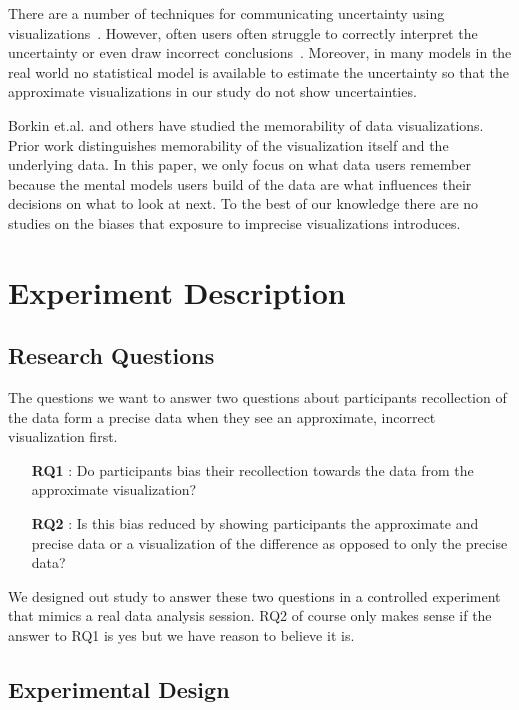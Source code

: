 \documentclass[10pt,journal,compsoc]{IEEEtran}
\begin{document}
There are a number of techniques for communicating uncertainty using visualizations~\cite{kay2016ish, olston2002visualizing}.
However, often users often struggle to correctly interpret the uncertainty or even draw incorrect conclusions~\cite{joslyn2013decisions}.
Moreover, in many models in the real world no statistical model is available to estimate the uncertainty so that the approximate visualizations in our study do not show uncertainties.

Borkin et.al. \cite{borkin2013makes} and others have studied the memorability of data visualizations.
Prior work distinguishes memorability of the visualization itself and the underlying data.
In this paper, we only focus on what data users remember because the mental models users build of the data are what influences their decisions on what to look at next.
To the best of our knowledge there are no studies on the biases that exposure to imprecise visualizations introduces.

\section{Experiment Description}\label{sec:experimental_setup}

\subsection{Research Questions}

The questions we want to answer two questions about participants recollection of the data form a precise data when they see an approximate, incorrect visualization first. 

\begin{enumerate}
  \item[\textbf{RQ1}]: Do participants bias their recollection towards the data from the approximate visualization?
  \item[\textbf{RQ2}]: Is this bias reduced by showing participants the approximate and precise data or a visualization of the difference as opposed to only the precise data?
\end{enumerate}

We designed out study to answer these two questions in a controlled experiment that mimics a real data analysis session.
RQ2 of course only makes sense if the answer to RQ1 is yes but we have reason to believe it is.

\subsection{Experimental Design}
\end{document}
